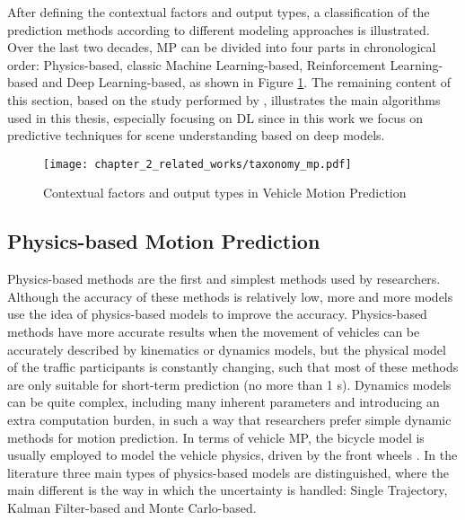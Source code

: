 After defining the contextual factors and output types, a classification of the prediction methods according to different modeling approaches is illustrated. Over the last two decades, \ac{MP} can be divided into four parts in chronological order: Physics-based, classic Machine Learning-based, Reinforcement Learning-based and Deep Learning-based, as shown in Figure \ref{fig:chapter_2_related_works/taxonomy_mp}. The remaining content of this section, based on the study performed by \cite{huang2022survey}, illustrates the main algorithms used in this thesis, especially focusing on \ac{DL} since in this work we focus on predictive techniques for scene understanding based on deep models.

\begin{figure}[h]
	\centering
	\texttt{[image: chapter\_2\_related\_works/taxonomy\_mp.pdf]}
	\caption{Contextual factors and output types in Vehicle Motion Prediction}
	\label{fig:chapter_2_related_works/taxonomy_mp}
\end{figure}

\subsection{Physics-based Motion Prediction}
\label{subsec:2_physics_based_mp}

Physics-based methods are the first and simplest methods used by researchers. Although the accuracy of these methods is relatively low, more and more models use the idea of physics-based models to improve the accuracy. Physics-based methods have more accurate results when the movement of vehicles can be accurately described by kinematics or dynamics models, but the physical model of the traffic participants is constantly changing, such that most of these methods are only suitable for short-term prediction (no more than 1 s). Dynamics models can be quite complex, including many inherent parameters and introducing an extra computation burden, in such a way that researchers prefer simple dynamic methods for motion prediction. In terms of vehicle \ac{MP}, the bicycle model is usually employed to model the vehicle physics, driven by the front wheels \cite{kaempchen2009situation, pepy2006reducing}. In the literature three main types of physics-based models are distinguished, where the main different is the way in which the uncertainty is handled: Single Trajectory, Kalman Filter-based and Monte Carlo-based.

